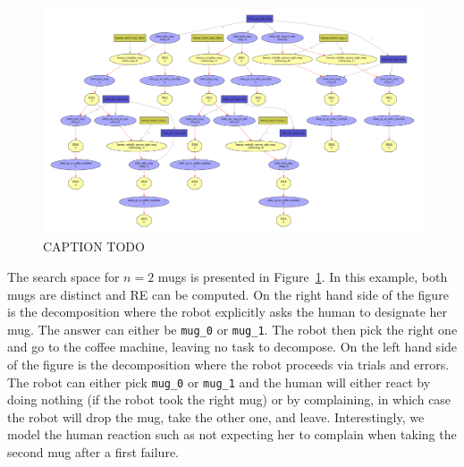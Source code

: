 \documentclass[a4paper,11pt,twoside]{StyleThese}
\begin{document}
\begin{figure}[hbtp]
\centering
\includegraphics[width=\textwidth]{figures/chapter4/mug_selection_search_space.png}
\caption{CAPTION TODO}
\label{fig:chap4mugsss}
\end{figure}

The search space for $n=2$ mugs is presented in Figure~\ref{fig:chap4mugsss}. In this example, both mugs are distinct and RE can be computed. On the right hand side of the figure is the decomposition where the robot explicitly asks the human to designate her mug. The answer can either be \verb'mug_0' or \verb'mug_1'. The robot then pick the right one and go to the coffee machine, leaving no task to decompose.
On the left hand side of the figure is the decomposition where the robot proceeds via trials and errors. The robot can either pick \verb'mug_0' or \verb'mug_1' and the human will either react by doing nothing (if the robot took the right mug) or by complaining, in which case the robot will drop the mug, take the other one, and leave. Interestingly, we model the human reaction such as not expecting her to complain when taking the second mug after a first failure.
\end{document}
